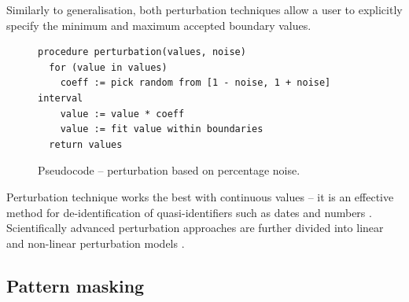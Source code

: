 \documentclass[a4paper,twoside,12pt]{book}
\begin{document}
Similarly to generalisation, both perturbation techniques allow a user to explicitly specify the minimum and maximum accepted boundary values.
%
\begin{figure}%
\begin{verbatim}
procedure perturbation(values, noise)
  for (value in values)
    coeff := pick random from [1 - noise, 1 + noise] interval
    value := value * coeff
    value := fit value within boundaries
  return values
\end{verbatim}
\caption{Pseudocode – perturbation based on percentage noise.}
\label{fig:code:perturbation_percentage}
\end{figure}
%
Perturbation technique works the best with continuous values -- it is an effective method for de-identification of quasi-identifiers such as dates and numbers \cite{bib:anonymisation_techniques_singapore}. Scientifically advanced perturbation approaches are further divided into linear and non-linear perturbation models \cite{bib:perturbation_methods}.


\subsection{Pattern masking}
\end{document}
